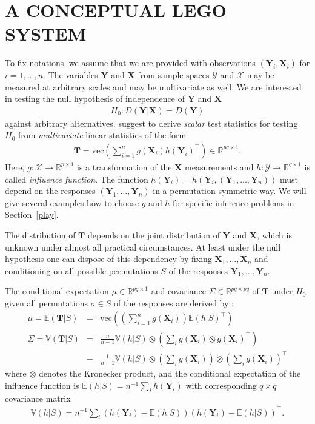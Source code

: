 \documentclass{article}
\newcommand{\R}{\mathbb{R} }
\newcommand{\V}{\mathbb{V}} %
\newcommand{\E}{\mathbb{E}} %
\newcommand{\X}{\mathbf{X}}
\newcommand{\Y}{\mathbf{Y}}
\newcommand{\T}{\mathbf{T}}
\renewcommand{\vec}{\text{vec}}
\begin{document}
\section{A CONCEPTUAL LEGO SYSTEM \label{CI}}

To fix notations,
we assume that we are provided with observations
$(\Y_i, \X_i)$ for $i = 1, \dots, n$.
The variables $\Y$ and $\X$ from sample spaces $\mathcal{Y}$ and
$\mathcal{X}$ may
be measured at arbitrary scales and may be multivariate as well. 
We are interested in testing the null hypothesis of independence of $\Y$ and $\X$
\begin{eqnarray*}
H_0: D(\Y | \X) = D(\Y)
\end{eqnarray*}
against arbitrary alternatives. \cite{StrasserWeber1999} suggest to derive
\textit{scalar} test statistics for testing $H_0$ from \textit{multivariate}
linear statistics of the form 
\begin{eqnarray*}
\T = \vec\left(\sum_{i = 1}^n g(\X_i) h(\Y_i)^\top\right)
\in \R^{pq \times 1}.
\end{eqnarray*}
Here, $g: \mathcal{X} \rightarrow \R^{p \times 1}$ is a transformation of
the $\X$ measurements and $h: \mathcal{Y} \rightarrow
\R^{q \times 1}$ is called \emph{influence function}. The function $h(\Y_i)
= h(\Y_i, (\Y_1, \dots, \Y_n))$ must depend on the responses $(\Y_1, \dots, \Y_n)$ in a permutation
symmetric way. We will give several examples how to choose $g$ and $h$
for specific inference problems in Section~\ref{play}.

The distribution of $\T$  depends on the joint distribution of $\Y$ and $\X$, 
which is unknown under almost all practical circumstances. 
At least under the null hypothesis one can dispose of this 
dependency by fixing $\X_1, \dots, \X_n$ and conditioning on all possible 
permutations $S$ of the responses $\Y_1, \dots, \Y_n$. 

The conditional expectation $\mu \in \R^{pq \times 1}$ and covariance
$\Sigma \in \R^{pq \times pq}$ of $\T$ under $H_0$ given
all permutations $\sigma \in S$ of the responses are derived by
\cite{StrasserWeber1999}:
\begin{eqnarray*}
\mu = \E(\T | S) & = & \vec \left( \left( \sum_{i = 1}^n g(\X_i) \right)
\E(h | S)^\top \right) \\
\Sigma = \V(\T | S) & = &
    \frac{n}{n - 1}  \V(h | S) \otimes
        \left(\sum_i g(\X_i) \otimes  g(\X_i)^\top \right)
\\
& - & \frac{1}{n - 1}  \V(h | S)  \otimes \left(
        \sum_i g(\X_i) \right) \otimes \left( \sum_i g(\X_i)\right)^\top
\nonumber
\end{eqnarray*}
where $\otimes$ denotes the Kronecker product, and the conditional
expectation of the influence function is $\E(h | S) = n^{-1} \sum_i
h(\Y_i)$ with corresponding $q \times q$ covariance matrix
\begin{eqnarray*}
\V(h | S) = n^{-1} \sum_i \left(h(\Y_i) - \E(h | S) \right) \left(h(\Y_i) - \E(h | S)\right)^\top.
\end{eqnarray*}
\end{document}

